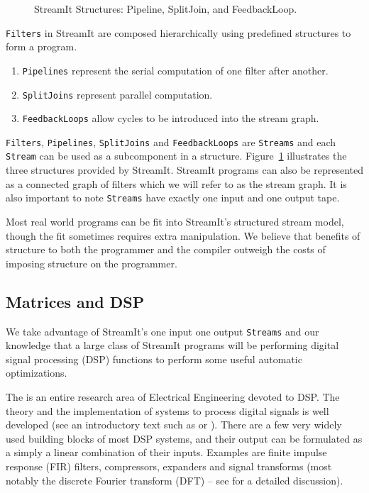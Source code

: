 \begin{figure}
\center
\epsfxsize=3.0in
\caption{StreamIt Structures: Pipeline, SplitJoin, and FeedbackLoop.}
\label{fig:structures}
\end{figure}

{\tt Filters} in StreamIt are composed hierarchically using predefined structures to form
a program. 

\begin{enumerate}
\item {\tt Pipelines} represent the serial computation of one filter after another.
\item {\tt SplitJoins} represent parallel computation. 
\item {\tt FeedbackLoops} allow cycles to be introduced into the stream graph. 
\end{enumerate}

{\tt Filters}, {\tt Pipelines}, {\tt SplitJoins} and {\tt FeedbackLoops} 
are {\tt Streams} and each {\tt Stream} can be used as a subcomponent in 
a structure. Figure~\ref{fig:structures} illustrates the three structures provided by StreamIt.
StreamIt programs can also be represented as a connected graph of filters 
which we will refer to as the stream graph. It is also important to note
{\tt Streams} have exactly one input and one output tape.

Most real world programs can be fit into StreamIt's structured stream model, 
though the fit sometimes requires extra manipulation. We believe
that benefits of structure to both the programmer and the compiler outweigh the
costs of imposing structure on the programmer.

\subsection{Matrices and DSP}
We take advantage of StreamIt's one input one output {\tt Streams} and 
our knowledge that a large class of StreamIt programs will be performing
digital signal processing (DSP) functions to perform some useful automatic 
optimizations.

The is an entire research area of Electrical Engineering devoted to DSP. The
theory and the implementation of systems to process digital signals is well developed (see
an introductory text such as\cite{oppenheim-discrete} or \cite{lyons-understanding}). 
There are a few very widely used building blocks of most DSP systems, and their output 
can be formulated as a simply a linear combination of their inputs. Examples are
finite impulse response (FIR) filters, compressors, expanders and signal transforms
(most notably the discrete Fourier transform (DFT) -- 
see \cite{oppenheim-discrete} for a detailed discussion).

